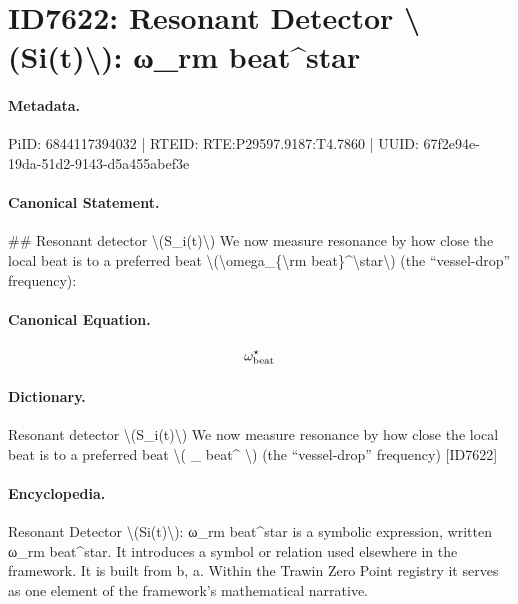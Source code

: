 \section*{ID7622: Resonant Detector \textbackslash{}(Si(t)\textbackslash{}): ω\_rm beat\textasciicircum{}star}
\paragraph{Metadata.}
PiID: 6844117394032 | RTEID: RTE:P29597.9187:T4.7860 | UUID: 67f2e94e-19da-51d2-9143-d5a455abef3e

\paragraph{Canonical Statement.}
\#\# Resonant detector \textbackslash{}(S\_i(t)\textbackslash{}) We now measure resonance by how close the local beat is to a preferred beat \textbackslash{}(\textbackslash{}omega\_\{\textbackslash{}rm beat\}\textasciicircum{}\textbackslash{}star\textbackslash{}) (the “vessel-drop” frequency):

\paragraph{Canonical Equation.}
\[
\omega_{\rm beat}^\star
\]

\paragraph{Dictionary.}
Resonant detector \textbackslash{}(S\_i(t)\textbackslash{}) We now measure resonance by how close the local beat is to a preferred beat \textbackslash{}( \_ beat\textasciicircum{} \textbackslash{}) (the “vessel-drop” frequency) [ID7622]

\paragraph{Encyclopedia.}
Resonant Detector \textbackslash{}(Si(t)\textbackslash{}): ω\_rm beat\textasciicircum{}star is a symbolic expression, written ω\_rm beat\textasciicircum{}star. It introduces a symbol or relation used elsewhere in the framework. It is built from b, a. Within the Trawin Zero Point registry it serves as one element of the framework's mathematical narrative.
